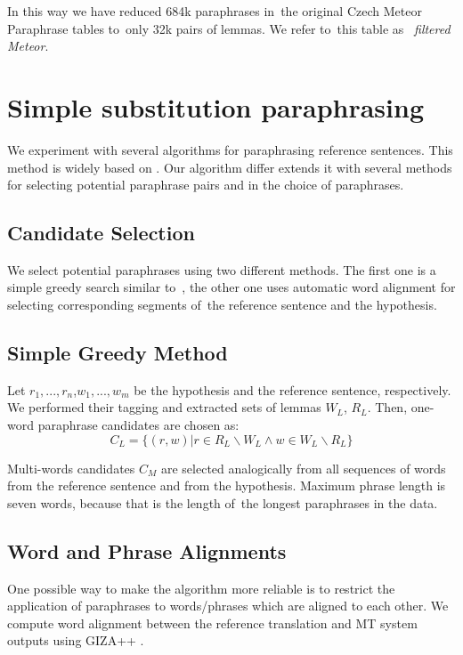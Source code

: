 \documentclass[11pt]{article}
\begin{document}
In this way we have reduced 684k paraphrases in~the original Czech Meteor 
Paraphrase tables to~only 32k pairs of lemmas. We refer to~this table as
~\textit{filtered Meteor}.

\section{Simple substitution paraphrasing}
\label{lrec}
We experiment with several algorithms for paraphrasing reference sentences. 
This method is widely based on . Our algorithm differ extends it 
with several methods for selecting potential paraphrase pairs and in the choice 
of paraphrases.

\subsection{Candidate Selection}
We select potential paraphrases using two different methods. The first one is a 
simple greedy search similar to~, the other one uses automatic 
word alignment for selecting corresponding segments of~the reference sentence 
and the hypothesis.

\subsection*{Simple Greedy Method}
Let $ r_1,..., r_n $,$ w_1,...,w_m $ be the hypothesis and the reference 
sentence, respectively. We performed their tagging and extracted sets of lemmas 
$ W_{L} $, $ R_{L} $. Then, one-word paraphrase candidates are chosen as:
$$ C_{L} = \lbrace (r,w) | r \in R_{L} \smallsetminus W_{L} \wedge w \in W_{L}
\smallsetminus R_{L}  \rbrace $$

Multi-words candidates $ C_M $ are selected analogically from all sequences 
of words from the reference sentence and from the hypothesis. Maximum phrase 
length is seven words, because that is the length of~the longest paraphrases in 
the data. %
%

\subsection*{Word and Phrase Alignments}
One possible way to make the algorithm more reliable is to restrict the 
application of paraphrases to words/phrases which are aligned to each other. We 
compute word alignment between the reference translation and MT system outputs 
using GIZA++ \cite{gizapp}.
\end{document}
